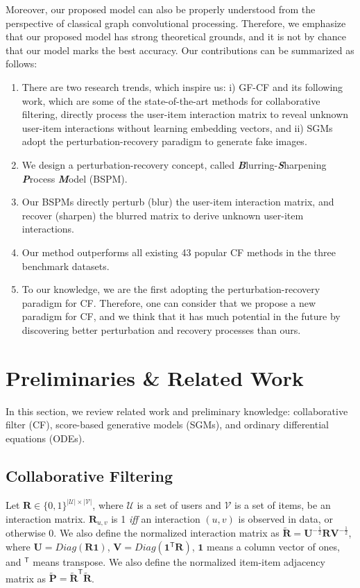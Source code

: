 \documentclass[sigconf,natbib=true]{acmart}
\begin{document}
Moreover, our proposed model can also be properly understood from the perspective of classical graph convolutional processing. Therefore, we emphasize that our proposed model has strong theoretical grounds, and it is not by chance that our model marks the best accuracy. Our contributions can be summarized as follows:
\begin{enumerate}
    \item There are two research trends, which inspire us: i) GF-CF and its following work, which are some of the state-of-the-art methods for collaborative filtering, directly process the user-item interaction matrix to reveal unknown user-item interactions without learning embedding vectors, and ii) SGMs adopt the perturbation-recovery paradigm to generate fake images.
    \item We design a perturbation-recovery concept, called \textit{\textbf{B}}lurring-\textit{\textbf{S}}harpening \textit{\textbf{P}}rocess \textit{\textbf{M}}odel (BSPM).
    \item Our BSPMs directly perturb (blur) the user-item interaction matrix, and recover (sharpen) the blurred matrix to derive unknown user-item interactions.
    \item Our method outperforms all existing 43 popular CF methods in the three benchmark datasets. 
\item To our knowledge, we are the first adopting the perturbation-recovery paradigm for CF. Therefore, one can consider that we propose a new paradigm for CF, and we think that it has much potential in the future by discovering better perturbation and recovery processes than ours.
\end{enumerate}


\section{Preliminaries \& Related Work}
In this section, we review related work and preliminary knowledge: collaborative filter (CF), score-based generative models (SGMs), and ordinary differential equations (ODEs).

\subsection{Collaborative Filtering}
Let $\bm{R} \in \{0,1\}^{|\mathcal{U}| \times |\mathcal{V}|}$, where $\mathcal{U}$ is a set of users and $\mathcal{V}$ is a set of items, be an interaction matrix. $\bm{R}_{u,v}$ is 1 \textit{iff} an interaction $(u,v)$ is observed in data, or otherwise 0. We also define the normalized interaction matrix as $\tilde{\bm{R}} = \bm{U}^{-\frac{1}{2}} \bm{R} \bm{V}^{-\frac{1}{2}}$, where $\bm{U} = Diag(\bm{R}  \bm{1})$, $\bm{V} = Diag(\bm{1}^{\mathsf{T}} \bm{R})$, $\bm{1}$ means a column vector of ones, and $^{\mathsf{T}}$ means transpose. We also define the normalized item-item adjacency matrix as $\tilde{\bm{P}} = \tilde{\bm{R}}^{\mathsf{T}}\tilde{\bm{R}}$.
\end{document}
